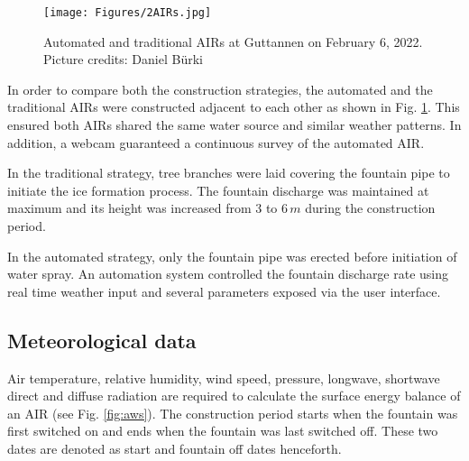 \documentclass[tc, manuscript]{copernicus}
\begin{document}
\begin{figure}[t]
\texttt{[image: Figures/2AIRs.jpg]}
\caption{Automated and traditional AIRs  at Guttannen on February 6, 2022. Picture credits: Daniel Bürki}
\label{fig:2AIR} 
\end{figure}

In order to compare both the construction strategies, the automated and the traditional AIRs were constructed
adjacent to each other as shown in Fig. \ref{fig:2AIR}. This ensured both AIRs shared the same water source
and similar weather patterns. In addition, a webcam guaranteed a continuous survey of the automated AIR.   

In the traditional strategy, tree branches were laid covering the fountain pipe to initiate the ice formation
process. The fountain discharge was maintained at maximum and its height was increased from 3 to 6\,$m$ during
the construction period.

In the automated strategy, only the fountain pipe was erected before initiation of water spray. An automation
system controlled the fountain discharge rate using real time weather input and several parameters exposed via
the user interface. 

\subsection{Meteorological data}
Air temperature, relative humidity, wind speed, pressure, longwave, shortwave direct and diffuse radiation are
required to calculate the surface energy balance of an AIR (see Fig. \ref{fig:aws}). The construction period starts when the
fountain was first switched on and ends when the fountain was last switched off. These two dates are denoted as
start and fountain off dates henceforth.
\end{document}
